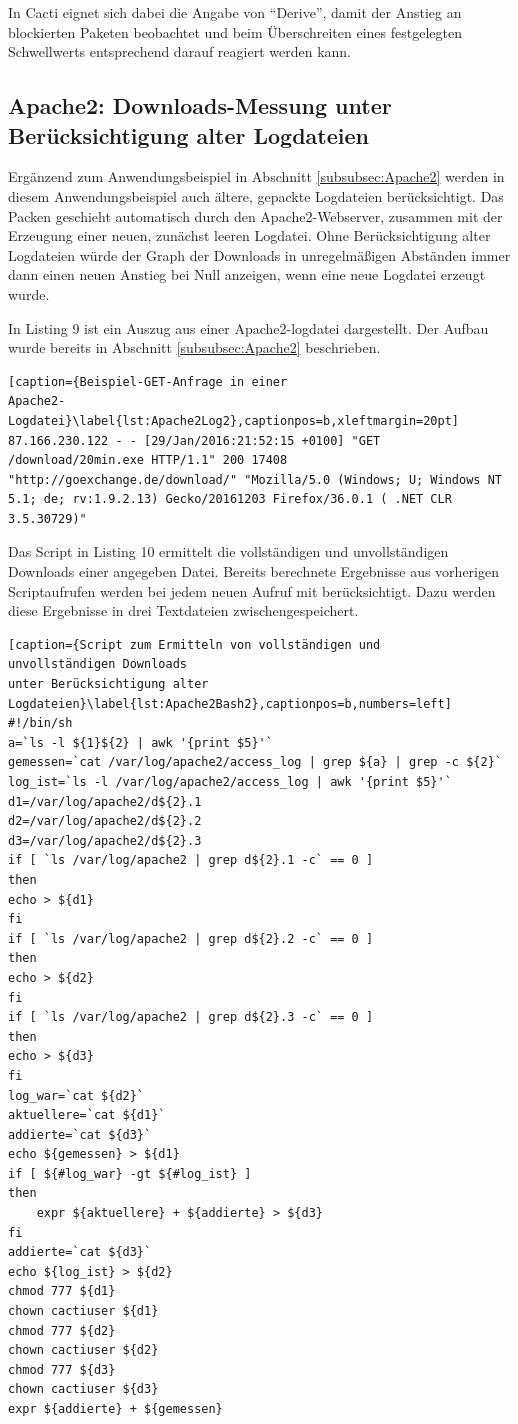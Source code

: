 \documentclass[12pt,ngerman,toc=listofnumbered,toc=bibliographynumbered,toc=index,headsepline=true]{scrbook}
\begin{document}
In Cacti eignet sich dabei die Angabe von \enquote{Derive}, damit der Anstieg an
blockierten Paketen beobachtet und beim Überschreiten eines festgelegten
Schwellwerts entsprechend darauf reagiert werden kann.

\subsection{Apache2: Downloads-Messung unter Berücksichtigung alter
Logdateien}
Ergänzend zum Anwendungsbeispiel in Abschnitt \ref{subsubsec:Apache2} werden in
diesem Anwendungsbeispiel auch ältere, gepackte Logdateien berücksichtigt. Das
Packen geschieht automatisch durch den Apache2-Webserver, zusammen mit der
Erzeugung einer neuen, zunächst leeren Logdatei. Ohne Berücksichtigung alter
Logdateien würde der Graph der Downloads in unregelmäßigen Abständen immer dann
einen neuen Anstieg bei Null anzeigen, wenn eine neue Logdatei erzeugt wurde.


In Listing 9 ist ein Auszug aus einer Apache2-logdatei dargestellt. Der Aufbau
wurde bereits in Abschnitt \ref{subsubsec:Apache2} beschrieben.

\begin{lstlisting}[caption={Beispiel-GET-Anfrage in einer
Apache2-Logdatei}\label{lst:Apache2Log2},captionpos=b,xleftmargin=20pt]
87.166.230.122 - - [29/Jan/2016:21:52:15 +0100] "GET /download/20min.exe HTTP/1.1" 200 17408 "http://goexchange.de/download/" "Mozilla/5.0 (Windows; U; Windows NT 5.1; de; rv:1.9.2.13) Gecko/20161203 Firefox/36.0.1 ( .NET CLR 3.5.30729)"
\end{lstlisting}

Das Script in Listing 10 ermittelt die vollständigen und unvollständigen
Downloads einer angegeben Datei. Bereits berechnete Ergebnisse aus vorherigen
Scriptaufrufen werden bei jedem neuen Aufruf mit berücksichtigt. Dazu werden
diese Ergebnisse in drei Textdateien zwischengespeichert.

\begin{lstlisting}[caption={Script zum Ermitteln von vollständigen und
unvollständigen Downloads
unter Berücksichtigung alter
Logdateien}\label{lst:Apache2Bash2},captionpos=b,numbers=left]
#!/bin/sh 
a=`ls -l ${1}${2} | awk '{print $5}'` 
gemessen=`cat /var/log/apache2/access_log | grep ${a} | grep -c ${2}` 
log_ist=`ls -l /var/log/apache2/access_log | awk '{print $5}'` 
d1=/var/log/apache2/d${2}.1 
d2=/var/log/apache2/d${2}.2 
d3=/var/log/apache2/d${2}.3 
if [ `ls /var/log/apache2 | grep d${2}.1 -c` == 0 ] 
then 
echo > ${d1} 
fi 
if [ `ls /var/log/apache2 | grep d${2}.2 -c` == 0 ] 
then 
echo > ${d2} 
fi 
if [ `ls /var/log/apache2 | grep d${2}.3 -c` == 0 ] 
then 
echo > ${d3} 
fi 
log_war=`cat ${d2}` 
aktuellere=`cat ${d1}` 
addierte=`cat ${d3}` 
echo ${gemessen} > ${d1} 
if [ ${#log_war} -gt ${#log_ist} ] 
then 
    expr ${aktuellere} + ${addierte} > ${d3} 
fi 
addierte=`cat ${d3}` 
echo ${log_ist} > ${d2} 
chmod 777 ${d1} 
chown cactiuser ${d1} 
chmod 777 ${d2} 
chown cactiuser ${d2} 
chmod 777 ${d3} 
chown cactiuser ${d3} 
expr ${addierte} + ${gemessen}
\end{lstlisting}
\end{document}
